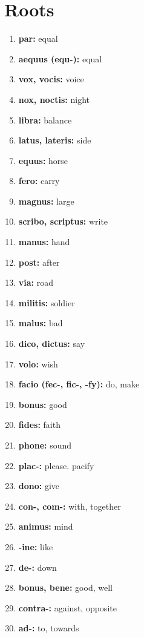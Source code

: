 \documentclass{article}
\begin{document}
\section{Roots}
\begin{enumerate}
    \item \textbf{par: }{equal}
    \item \textbf{aequus (equ-): }{equal}
    \item \textbf{vox, vocis: }{voice}
    \item \textbf{nox, noctis: }{night}
    \item \textbf{libra: }{balance}
    \item \textbf{latus, lateris: }{side}
    \item \textbf{equus: }{horse}
    \item \textbf{fero: }{carry}
    \item \textbf{magnus: }{large}
    \item \textbf{scribo, scriptus: }{write}
    \item \textbf{manus: }{hand}
    \item \textbf{post: }{after}
    \item \textbf{via: }{road}
    \item \textbf{militis: }{soldier}
    \item \textbf{malus: }{bad}
    \item \textbf{dico, dictus: }{say}
    \item \textbf{volo: }{wish}
    \item \textbf{facio (fec-, fic-, -fy): }{do, make}
    \item \textbf{bonus: }{good}
    \item \textbf{fides: }{faith}
    \item \textbf{phone: }{sound}
    \item \textbf{plac-: }{please. pacify}
    \item \textbf{dono: }{give}
    \item \textbf{con-, com-: }{with, together}
    \item \textbf{animus: }{mind}
    \item \textbf{-ine: }{like}
    \item \textbf{de-: }{down}
    \item \textbf{bonus, bene: }{good, well}
    \item \textbf{contra-: }{against, opposite}
    \item \textbf{ad-: }{to, towards}
    
\end{enumerate}
\end{document}
